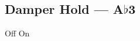 \subsection[Damper Hold]{Damper Hold --- \UiKey{\SET}A$\flat$3}









































Off
On
